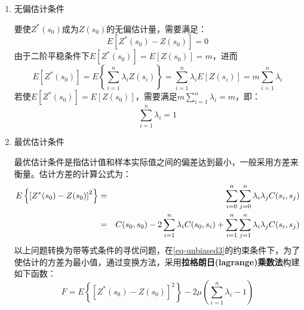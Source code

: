 \begin{enumerate}
    \item 无偏估计条件

        要使$Z^*(s_0)$成为$Z(s_0)$的无偏估计量，需要满足：
        \begin{equation}
            E\left[ Z^*(s_0)-Z(s_0) \right] = 0
            \label{eq-unbiased1}
        \end{equation}
        由于二阶平稳条件下$E[ Z^*(s_0) ] = E [ Z(s_0) ] = m$，进而
        \begin{equation}
            E [ Z^*(s_0) ] = E \left\{  \sum\limits_{i=1}^{n}\lambda_iZ(s_i) \right\} = \sum\limits_{i=1}^{n}\lambda_i E [ Z(s_i) ] = m \sum\limits_{i=1}^{n} \lambda_i
            \label{eq-unbiased2}
        \end{equation}
        若使$E\left[ Z^*(s_0) \right]  = E [ Z(s_0) ]$，需要满足$m\sum\limits_{i=1}^{n}\lambda_i = m$，即：
        \begin{equation}
            \sum\limits_{i=1}^{n}\lambda_i = 1
            \label{eq-unbiased3}
        \end{equation}
    \item 最优估计条件
    
        最优估计条件是指估计值和样本实际值之间的偏差达到最小，一般采用方差来衡量。估计方差的计算公式为：
        \begin{eqnarray}
        E\left\{ \left[ Z^*(s_0) - Z(s_0) \right]^2 \right\} &=& \sum\limits_{i=0}^{n}\sum\limits_{j=0}^{n}\lambda_i\lambda_jC(s_i,s_j) \notag \\
            &=& C(s_0,s_0) - 2\sum\limits_{i=1}^{n}\lambda_iC(s_0,s_i)+\sum\limits_{i=1}^{n}\sum\limits_{j=1}^{n}\lambda_i\lambda_jC(s_i,s_j)
            \label{eq-optivar}
        \end{eqnarray}
        以上问题转换为带等式条件的寻优问题，在\cref{eq-unbiased3}的约束条件下，为了使估计的方差为最小值，通过变换方法，采用\textbf{\textcolor[rgb]{1,0,0}{拉格朗日(lagrange)乘数法}}构建如下函数：
        \begin{equation}
            F= E\left\{ \left[ Z^*(s_0) - Z(s_0) \right]^2 \right\} - 2\mu\left( \sum\limits_{i=1}^{n} \lambda_i -1 \right)
            \label{eq-transfomredvar}
        \end{equation}
\end{enumerate}

